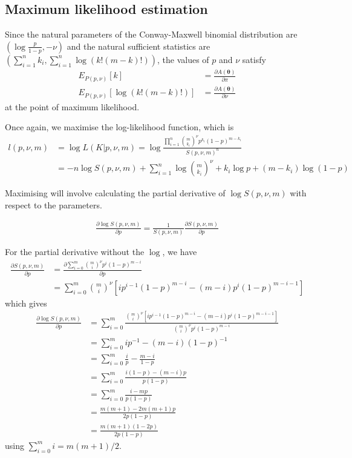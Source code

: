 \documentclass[a4paper,12pt]{article}
\theoremstyle{definition}
\newcommand{\pdiff}[2]{\frac{\partial #1}{\partial #2}} %
\begin{document}
\subsection{Maximum likelihood estimation}
Since the natural parameters of the Conway-Maxwell binomial distribution are $\left( \log \frac{p}{1-p}, -\nu \right)$ and the natural sufficient statistics are $\left( \sum_{i=1}^n k_i, \sum_{i=1}^n \log (k! (m-k)!) \right)$, the values of $p$ and $\nu$ satisfy 
\begin{align}
  E_{P(p,\nu)}[k] & = \pdiff{A(\boldsymbol{\theta})}{\pi} \\
  E_{P(p, \nu)}[\log (k!(m-k)!)] & = \pdiff{A(\boldsymbol{\theta})}{\nu}
\end{align}
at the point of maximum likelihood.

Once again, we maximise the log-likelihood function, which is
\begin{align}
  l(p, \nu, m) &= \log L(K | p, \nu, m) = \log \frac{\prod_{i=1}^{n} \binom{m}{k_i}^{\nu} p^{k_i} (1-p)^{m-k_i}}{S(p, \nu, m)^n} \\
  &= - n \log S(p, \nu, m) + \sum_{i=1}^{n} \log \binom{m}{k_i}^{\nu} + k_i \log p + (m - k_i) \log (1-p)
\end{align}

Maximising will involve calculating the partial derivative of $\log S(p, \nu, m)$ with respect to the parameters. 

\begin{align}
  \pdiff{\log S(p, \nu, m)}{p} = \frac{1}{S(p, \nu, m)} \pdiff{S(p, \nu, m)}{p}
\end{align}

For the partial derivative without the $\log$, we have
\begin{align}
  \pdiff{S(p, \nu, m)}{p} &= \pdiff{\sum_{i=0}^m \binom{m}{i}^{\nu} p^i (1-p)^{m-i}}{p} \\
  & = \sum_{i=0}^m \binom{m}{i}^{\nu} \left[ i p^{i-1}(1-p)^{m-i} - (m-i)p^i(1-p)^{m-i-1} \right]
\end{align}
which gives
\begin{align}
  \pdiff{\log S(p, \nu, m)}{p} & = \sum_{i=0}^m \frac{\binom{m}{i}^{\nu} \left[ i p^{i-1}(1-p)^{m-i} - (m-i)p^i(1-p)^{m-i-1} \right]}{\binom{m}{i}^{\nu} p^{i} (1-p)^{m-i}} \\
  & = \sum_{i=0}^m i p^{-1} - (m-i) (1-p)^{-1} \\
  & = \sum_{i=0}^m \frac{i}{p} - \frac{m-i}{1-p} \\
  & = \sum_{i=0}^m \frac{i(1-p) - (m-i)p}{p(1-p)} \\
  & = \sum_{i=0}^m \frac{i - mp}{p(1-p)} \\
  & = \frac{m(m+1) -2m(m+1)p}{2p(1-p)} \\
  & = \frac{m(m+1)(1-2p)}{2p(1-p)}
\end{align}
using $\sum_{i=0}^{m} i = m(m+1)/2$.
\end{document}
